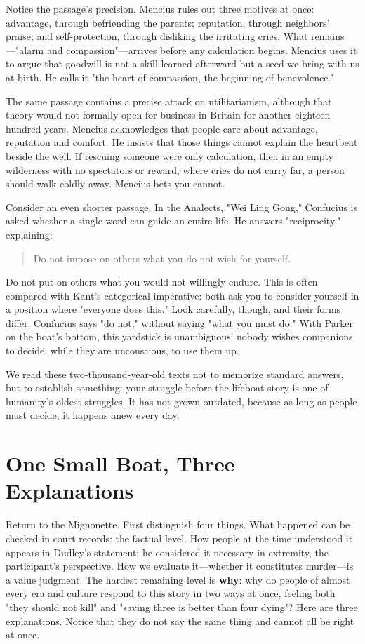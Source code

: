Notice the passage's precision. Mencius rules out three motives at once: advantage, through befriending the parents; reputation, through neighbors' praise; and self-protection, through disliking the irritating cries. What remains---"alarm and compassion"---arrives before any calculation begins. Mencius uses it to argue that goodwill is not a skill learned afterward but a seed we bring with us at birth. He calls it "the heart of compassion, the beginning of benevolence."

The same passage contains a precise attack on utilitarianism, although that theory would not formally open for business in Britain for another eighteen hundred years. Mencius acknowledges that people care about advantage, reputation and comfort. He insists that those things cannot explain the heartbeat beside the well. If rescuing someone were only calculation, then in an empty wilderness with no spectators or reward, where cries do not carry far, a person should walk coldly away. Mencius bets you cannot.

Consider an even shorter passage. In the Analects, "Wei Ling Gong," Confucius is asked whether a single word can guide an entire life. He answers "reciprocity," explaining:

\begin{quote}
Do not impose on others what you do not wish for yourself.
\end{quote}
Do not put on others what you would not willingly endure. This is often compared with Kant's categorical imperative: both ask you to consider yourself in a position where "everyone does this." Look carefully, though, and their forms differ. Confucius says "do not," without saying "what you must do." With Parker on the boat's bottom, this yardstick is unambiguous: nobody wishes companions to decide, while they are unconscious, to use them up.

We read these two-thousand-year-old texts not to memorize standard answers, but to establish something: your struggle before the lifeboat story is one of humanity's oldest struggles. It has not grown outdated, because as long as people must decide, it happens anew every day.

\section{One Small Boat, Three Explanations}
Return to the Mignonette. First distinguish four things. What happened can be checked in court records: the factual level. How people at the time understood it appears in Dudley's statement: he considered it necessary in extremity, the participant's perspective. How we evaluate it---whether it constitutes murder---is a value judgment. The hardest remaining level is \textbf{why}: why do people of almost every era and culture respond to this story in two ways at once, feeling both "they should not kill" and "saving three is better than four dying"? Here are three explanations. Notice that they do not say the same thing and cannot all be right at once.

